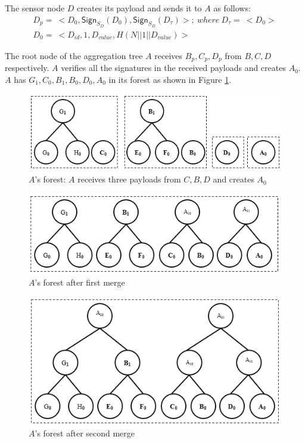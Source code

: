 		The sensor node $D$ creates its payload and sends it to $A$ as follows:
		\begin{equation}
			\begin{array}{l}
				D_{p} =\ <D_{0}, \textsf{Sign}_{S_{D}}(D_{0}), \textsf{Sign}_{S_{D}}(D_{\tau})>;\ where\ D_{\tau} =\ <D_{0}>\\
				D_{0} =\ <D_{id},1,D_{value},H(N||1||D_{value})>
			\end{array}
			\label{eq:d-payload}
		\end{equation}

		The root node of the aggregation tree $A$ receives $B_{p}, C_{p}, D_{p}$
		from $B,C,D$ respectively.
		$A$ verifies all the signatures in the received payloads and creates $A_{0}$.
		$A$ has $G_{1},C_{0},B_{1},B_{0},D_{0},A_{0}$ in its forest as shown in Figure \ref{fig:a-forest}.
		\begin{figure}[h!]
			\centering
			\includegraphics[scale=1]{images/a-forest.png}
			\caption{$A$'s forest: $A$ receives three payloads from $C,B,D$ and creates $A_{0}$}
			\label{fig:a-forest}
		\end{figure}
		\begin{figure}[h!]
			\centering
			\includegraphics[scale=1]{images/a-forest-first-merge.png}
			\caption{$A$'s forest after first merge}
			\label{fig:a-forest-first-merge}
		\end{figure}
		\begin{figure}[h!]
			\centering
			\includegraphics[scale=1]{images/a-forest-second-merge.png}
			\caption{$A$'s forest after second merge}
			\label{fig:a-forest-second-merge}
		\end{figure}
